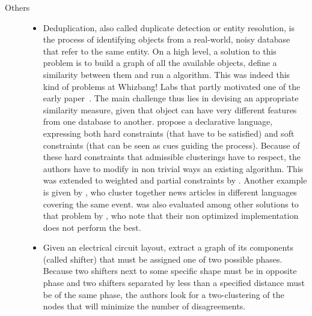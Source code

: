 \begin{description}
   \item[Others]
      \begin{itemize}[leftmargin=*]
	 \item
	    Deduplication, also called duplicate detection or entity resolution, is the process
	    of identifying objects from a real-world, noisy database that refer to the same entity.
	    On a high level, a solution to this problem is to build a graph of all the available
	    objects, define a similarity between them and run a \pcc{} algorithm. This was indeed
	    this kind of problems at Whizbang! Labs that partly motivated one of the early \pcc{}
	    paper~\autocite{Bansal2002}. The main challenge
	    thus lies in devising an appropriate similarity measure, given that object can have very
	    different features from one database to another. \Textcite{LargeScaleDeDup09} propose a
	    declarative language, expressing both hard constraints (that have to be satisfied) and
	    soft constraints (that can be seen as cues guiding the process). Because of these hard
	    constraints that admissible clusterings have to respect, the authors have to modify in
	    non trivial ways an existing \pcc{} algorithm. This was extended to weighted and partial
	    constraints  by \textcite{WeightedER14}. Another example is given by
	    \textcite{Crosslingual07}, who cluster together news articles in different languages
	    covering the same event. \pcc{} was also evaluated among other
	    solutions to that problem by \textcite{DeDup09}, who note that their non optimized
	    implementation does not perform the best.
	 \item 
	    Given an electrical circuit layout, \textcite{circuitDesign07} extract a graph of its
	    components (called shifter) that must be assigned one of two possible phases. Because
	    two shifters next to some specific shape must be in opposite phase and two shifters
	    separated by less than a specified distance must be of the same phase, the authors look
	    for a two-clustering of the nodes that will minimize the number of disagreements.
      \end{itemize}
\end{description}
